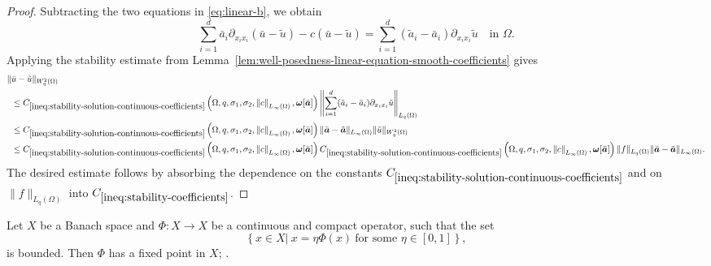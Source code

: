 \documentclass[final,onefignum,onetabnum]{mousaviart}
\begin{document}
	\begin{proof}
		Subtracting the two equations in \eqref{eq:linear-b}, we obtain
		\[
		\sum_{i=1}^{d}
		\bar{a}_i \partial_{x_i x_i}(\bar u - \tilde u)
		-
		c(\bar u - \tilde u)
		=
		\sum_{i=1}^{d}
		(\tilde{a}_i - \bar{a}_i)
		\partial_{x_i x_i} \tilde u
		\quad \text{in } \Omega.
		\]
		Applying the stability estimate from Lemma~\ref{lem:well-posedness-linear-equation-smooth-coefficients} gives
		\[
		\begin{aligned}
			\| & \bar u  -  \tilde u \|_{W^{2}_q(\Omega)}
			\\
			&\le
			C_{\ref{ineq:stability-solution-continuous-coefficients}} \left( \Omega, q, \sigma_1, \sigma_2, \left\| c \right\|_{L_{\infty}(\Omega)},
			\boldsymbol{\omega}[\bar{\boldsymbol{a}}]	
			\right)
			\left\|
			\sum_{i=1}^{d}
			(\tilde{a}_i - \bar{a}_i)
			\partial_{x_i x_i} \tilde u
			\right\|_{L_q(\Omega)}
			\\
			&\le
			C_{\ref{ineq:stability-solution-continuous-coefficients}} \left( \Omega, q, \sigma_1, \sigma_2, \left\| c \right\|_{L_{\infty}(\Omega)},
			\boldsymbol{\omega}[\bar{\boldsymbol{a}}]	
			\right)
			\| \bar{\boldsymbol{a}} - \tilde{\boldsymbol{a}} \|_{L_\infty(\Omega)}
			\| \tilde u \|_{W^{2}_q(\Omega)}
			\\
			&\le
			C_{\ref{ineq:stability-solution-continuous-coefficients}} \left( \Omega, q, \sigma_1, \sigma_2, \left\| c \right\|_{L_{\infty}(\Omega)},
			\boldsymbol{\omega}[\bar{\boldsymbol{a}}]	
			\right)
			C_{\ref{ineq:stability-solution-continuous-coefficients}} \left( \Omega, q, \sigma_1, \sigma_2, \left\| c \right\|_{L_{\infty}(\Omega)},
			\boldsymbol{\omega}[\tilde{\boldsymbol{a}}]	
			\right)
			\| f \|_{L_q(\Omega)}
			\| \bar{\boldsymbol{a}} - \tilde{\boldsymbol{a}} \|_{L_\infty(\Omega)}.
		\end{aligned}
		\]
		The desired estimate follows by absorbing the dependence on the constants  $C_{\ref{ineq:stability-solution-continuous-coefficients}}$ and on $\| f \|_{L_q(\Omega)}$ into 
		$C_{\ref{ineq:stability-coefficients}}$.
	\end{proof}
	\begin{theorem}
		\label{the:schauder-fixed-poin}
		Let $X$ be a Banach space and $\Phi: X \rightarrow X$ be a continuous and compact operator, such that the set
		\begin{equation}
			\label{set:shauder-theorem}
			\left\lbrace x \in X \big|~ x = \eta \Phi(x)
			~ \text{for some } \eta \in [0,1]
			\right\rbrace, 
		\end{equation}
		is bounded. Then $\Phi$ has a fixed point in $X$; . 
	\end{theorem}
\end{document}
